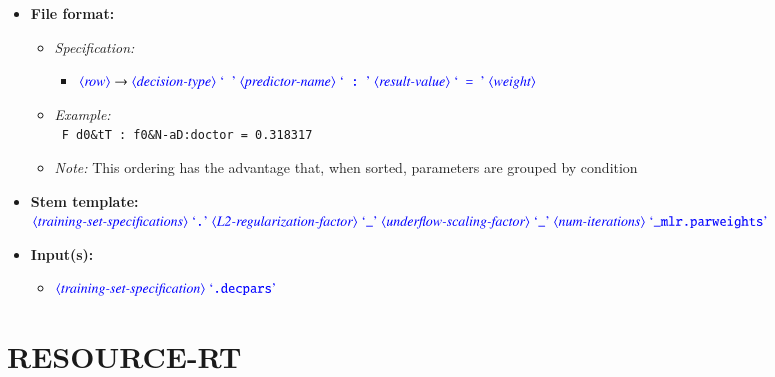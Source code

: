 \documentclass[12pt]{report}
\def\magenta{\color{magenta}}
\begin{document}
\begin{itemize}
      \item \textbf{File format:}
      \begin{itemize}
            \item \textit{Specification:}
            \begin{itemize}
                  \item {\small $\dtype{row} \rightarrow \dtype{decision-type} \ \dcode{\ } \ \dtype{predictor-name} \ \dcode{\ :\ } \ \dtype{result-value} \ \dcode{\ =\ } \ \dtype{weight}$}
            \end{itemize}
            \item \textit{Example:}\\
            {\magenta\tt
            F d0\&tT : f0\&N-aD:doctor = 0.318317
            }
            \item \textit{Note:} This ordering has the advantage that, when sorted, parameters are grouped by condition
      \end{itemize}
      \item \textbf{Stem template:}\\
      $\dtype{training-set-specifications} \ \dcode{.} \ \dtype{L2-regularization-factor} \ \dcode{\_} \ \dtype{underflow-scaling-factor} \ \dcode{\_} \ \dtype{num-iterations} \ \dcode{\_mlr.parweights}$
      \item \textbf{Input(s):}
      \begin{itemize}
            \item $\dtype{training-set-specification} \ \dcode{.decpars}$
      \end{itemize}
\end{itemize}







\chapter{RESOURCE-RT}
\end{document}
